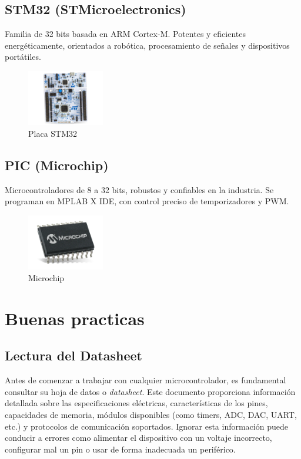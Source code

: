 \documentclass[a4paper,11pt]{article}
\begin{document}
\subsection{STM32 (STMicroelectronics)}
Familia de 32 bits basada en ARM Cortex-M. Potentes y eficientes energ\'eticamente, orientados a rob\'otica, procesamiento de se\~nales y dispositivos port\'atiles.

\begin{figure}[H]
  \centering
  \includegraphics[width=0.3\textwidth]{img/STM32.png}
  \caption{Placa STM32}
  \label{fig:uno}
\end{figure}

\subsection{PIC (Microchip)}
Microcontroladores de 8 a 32 bits, robustos y confiables en la industria. Se programan en MPLAB X IDE, con control preciso de temporizadores y PWM.


\begin{figure}[H]
  \centering
  \includegraphics[width=0.3\textwidth]{img/PIC.png}
  \caption{Microchip}
  \label{fig:uno}
\end{figure}

\section{Buenas practicas}

\subsection{Lectura del Datasheet}
Antes de comenzar a trabajar con cualquier microcontrolador, es fundamental consultar su hoja de datos o \textit{datasheet}. Este documento proporciona informaci\'on detallada sobre las especificaciones el\'ectricas, caracter\'isticas de los pines, capacidades de memoria, m\'odulos disponibles (como timers, ADC, DAC, UART, etc.) y protocolos de comunicaci\'on soportados. Ignorar esta informaci\'on puede conducir a errores como alimentar el dispositivo con un voltaje incorrecto, configurar mal un pin o usar de forma inadecuada un perif\'erico.
\end{document}
